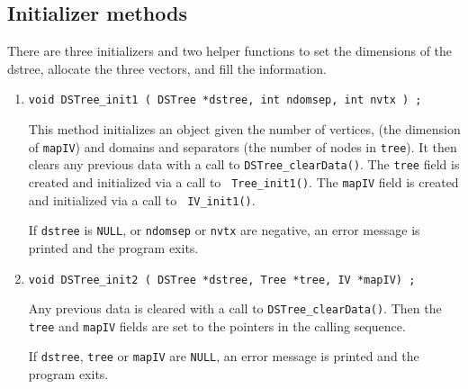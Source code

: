 \subsection{Initializer methods}
\label{subsection:DSTree:proto:initializers}
\par
There are three initializers and two helper functions to set the
dimensions of the dstree, allocate the three vectors, and fill the
information.
\par
\begin{enumerate}
\item
\begin{verbatim}
void DSTree_init1 ( DSTree *dstree, int ndomsep, int nvtx ) ;
\end{verbatim}
This method initializes an object given the number of vertices,
(the dimension of {\tt mapIV})
and domains and separators (the number of nodes in {\tt tree}).
It then clears any previous data with a call to 
{\tt DSTree\_clearData()}. 
The {\tt tree} field is created and initialized via a call to {\tt
Tree\_init1()}.
The {\tt mapIV} field is created and initialized via a call to {\tt
IV\_init1()}.
\par {}
If {\tt dstree} is {\tt NULL}, 
or {\tt ndomsep} or {\tt nvtx} are negative, 
an error message is printed and the program exits.
\item
\begin{verbatim}
void DSTree_init2 ( DSTree *dstree, Tree *tree, IV *mapIV) ;
\end{verbatim}
Any previous data is cleared with a call to 
{\tt DSTree\_clearData()}. 
Then the {\tt tree} and {\tt mapIV} fields are set to the pointers
in the calling sequence.
\par {}
If {\tt dstree}, {\tt tree} or {\tt mapIV} are {\tt NULL},
an error message is printed and the program exits.
\end{enumerate}
\par
